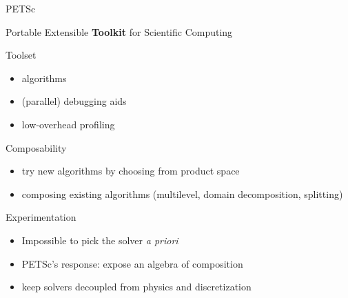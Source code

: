 \begin{frame}{PETSc}

\begin{center} Portable Extensible {\bf Toolkit} for Scientific Computing \end{center}

\begin{block}{Toolset}
  \begin{itemize}
   \item algorithms
   \item (parallel) debugging aids
   \item low-overhead profiling
  \end{itemize}
\end{block}

\begin{block}{Composability}
 \begin{itemize}
  \item try new algorithms by choosing from product space
  \item composing existing algorithms (multilevel, domain decomposition, splitting)
 \end{itemize}
\end{block}

\begin{block}{Experimentation}
\begin{itemize}
  \item Impossible to pick the solver \emph{a priori}
  \item PETSc's response: expose an algebra of composition
  \item keep solvers decoupled from physics and discretization
\end{itemize}
\end{block}
\end{frame}

